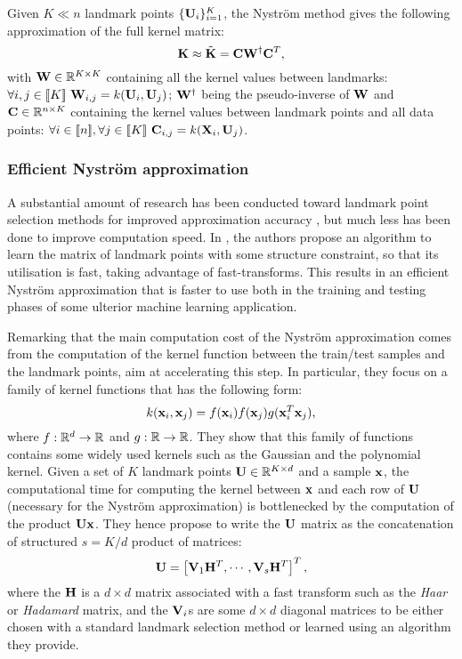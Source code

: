 Given $K \ll n$ landmark points $\{{\mathbf{U}}_i\}_{i=1}^{K}$, the Nyström method gives the following approximation of the full kernel matrix:
%
\begin{equation}
 \label{eq:nystrom}
 {\mathbf{K}} \approx \tilde{{\mathbf{K}}} = {\mathbf{C}}{\mathbf{W}}^\dagger{\mathbf{C}}^T,
\end{equation}
%
with ${\mathbf{W}} \in \mathbb{R}^{K \times K}$ containing all the kernel values between landmarks: $\forall i,j \in [\![K]\!]~ {\mathbf{W}}_{i,j} = k({\mathbf{U}}_i, {\mathbf{U}}_j)$; ${\mathbf{W}}^\dagger$ being the pseudo-inverse of ${\mathbf{W}}$ and ${\mathbf{C}} \in \mathbb{R}^{n \times K}$ containing the kernel values between landmark points and all data points: $\forall i \in [\![n]\!], \forall j \in [\![K]\!]~ {\mathbf{C}}_{i, j} = k({\mathbf{X}}_i, {\mathbf{U}}_j)$.

\subsubsection{Efficient Nyström approximation}

A substantial amount of research has been conducted toward landmark point selection methods for improved approximation accuracy \cite{kumar2012sampling} \cite{musco2017recursive}, but much less has been done to improve computation speed. In \cite{si2016computationally}, the authors propose an algorithm to learn the matrix of landmark points with some structure constraint, so that its utilisation is fast, taking advantage of fast-transforms. This results in an efficient Nyström approximation that is faster to use both in the training and testing phases of some ulterior machine learning application.

Remarking that the main computation cost of the Nyström approximation comes from the computation of the kernel function between the train/test samples and the landmark points, \cite{si2016computationally} aim at accelerating this step. In particular, they focus on a family of kernel functions that has the following form:
%
\begin{equation}
 k({\mathbf{x}}_i, {\mathbf{x}}_j) = f({\mathbf{x}}_i) f({\mathbf{x}}_j) g({\mathbf{x}}_i^T{\mathbf{x}}_j),
\end{equation}
%
where $f: \mathbb{R}^d \rightarrow \mathbb{R}$ and $g: \mathbb{R} \rightarrow \mathbb{R}$. They show that this family of functions contains some widely used kernels such as the Gaussian and the polynomial kernel. Given a set of $K$ landmark points ${\mathbf{U}} \in \mathbb{R}^{K \times d}$ and a sample ${\mathbf{x}}$, the computational time for computing the kernel between ${\mathbf{x}}$ and each row of ${\mathbf{U}}$ (necessary for the Nyström approximation) is bottlenecked by the computation of the product ${\mathbf{U}}{\mathbf{x}}$. They hence propose to write the ${\mathbf{U}}$ matrix as the concatenation of structured $s = K / d$ product of matrices:
%
\begin{equation}
 {\mathbf{U}} = \left[ {\mathbf{V}}_1 {\mathbf{H}}^T, \cdots, {\mathbf{V}}_s{\mathbf{H}}^T  \right]^T,
\end{equation}
%
where the ${\mathbf{H}}$ is a $d \times d$ matrix associated with a fast transform such as the \textit{Haar} or \textit{Hadamard} matrix, and the ${\mathbf{V}}_i$s are some $d \times d$ diagonal matrices to be either chosen with a standard landmark selection method or learned using an algorithm they provide.

